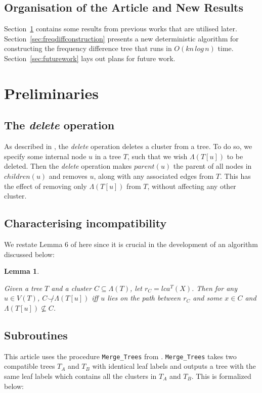 \documentclass{article}
\newcommand{\compatible}{\smile}
\newcommand{\leafset}{\Lambda}
\newtheorem{incompatibility}{Lemma}
\begin{document}
    \subsection{Organisation of the Article and New Results}
    Section~\ref{sec:preliminaries} contains some results from previous works that are utilised later. Section~\ref{sec:freqdiffconstruction} presents a new deterministic algorithm for constructing the frequency difference tree that runs in $O(kn\,log\,n)$ time. Section~\ref{sec:futurework} lays out plans for future work.

    \section{Preliminaries}
    \label{sec:preliminaries}

    \subsection{The \textit{delete} operation}
    As described in \cite{jansson2018algorithms}, the \textit{delete} operation deletes a cluster from a tree. To do so, we specify some internal node $u$ in a tree $T$, such that we wish $\leafset(T[u])$ to be deleted. Then the \textit{delete} operation makes $parent(u)$ the parent of all nodes in $children(u)$ and removes $u$, along with any associated edges from $T$. This has the effect of removing only $\leafset(T[u])$ from $T$, without affecting any other cluster.

    \subsection{Characterising incompatibility}
    We restate Lemma 6 of \cite{jansson2018algorithms} here since it is crucial in the development of an algorithm discussed below:

    \begin{incompatibility}
        \label{lem:incompatibility}

        Given a tree $T$ and a cluster $C \subseteq \leafset(T)$, let $r_C = lca^T(X)$. Then for any $u \in V(T)$, $C \not\compatible \leafset(T[u])$ iff $u$ lies on the path between $r_C$ and some $x \in C$ and $\leafset(T[u]) \not\subseteq C$.
    \end{incompatibility}

    \subsection{Subroutines}
    This article uses the procedure \texttt{Merge\_Trees} from \cite{jansson2016improved}. \texttt{Merge\_Trees} takes two compatible trees $T_A$ and $T_B$ with identical leaf labels and outputs a tree with the same leaf labels which contains all the clusters in $T_A$ and $T_B$. This is formalized below:
\end{document}
